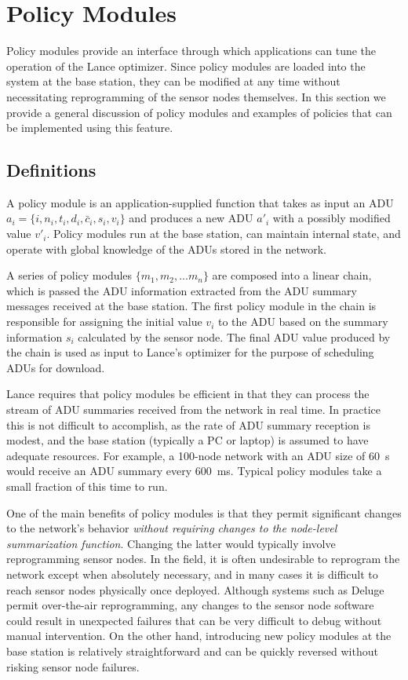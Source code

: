 \section{Policy Modules}
\label{lance-sec-policies}

Policy modules provide an interface through which applications can tune the
operation of the Lance optimizer. Since policy modules are loaded into the
system at the base station, they can be modified at any time without
necessitating reprogramming of the sensor nodes themselves. In this section
we provide a general discussion of policy modules and examples of policies
that can be implemented using this feature.

\subsection{Definitions}

A policy module is an application-supplied function that takes as input an
ADU $a_i = \{ i, n_i, t_i, d_i, \bar{c}_i, s_i, v_i \}$ and produces a new
ADU $a'_i$ with a possibly modified value $v'_i$. Policy modules run at the
base station, can maintain internal state, and operate with global knowledge
of the ADUs stored in the network.

\vfill\eject

A series of policy modules $\{m_1, m_2, ... m_n\}$ are composed into a linear
chain, which is passed the ADU information extracted from the ADU summary
messages received at the base station. The first policy module in the chain
is responsible for assigning the initial value $v_i$ to the ADU based on the
summary information $s_i$ calculated by the sensor node. The final ADU value
produced by the chain is used as input to Lance's optimizer for the purpose
of scheduling ADUs for download.

Lance requires that policy modules be efficient in that they can process the
stream of ADU summaries received from the network in real time. In practice
this is not difficult to accomplish, as the rate of ADU summary reception is
modest, and the base station (typically a PC or laptop) is assumed to have
adequate resources. For example, a 100-node network with an ADU size of
60~s would receive an ADU summary every 600~ms. Typical policy modules
take a small fraction of this time to run.

One of the main benefits of policy modules is that they permit significant
changes to the network's behavior \textit{without requiring changes to the
node-level summarization function}. Changing the latter would typically
involve reprogramming sensor nodes. In the field, it is often undesirable to
reprogram the network except when absolutely necessary, and in many cases it
is difficult to reach sensor nodes physically once deployed. Although systems
such as Deluge~\cite{deluge} permit over-the-air reprogramming, any changes
to the sensor node software could result in unexpected failures that can be
very difficult to debug without manual intervention. On the other hand,
introducing new policy modules at the base station is relatively
straightforward and can be quickly reversed without risking sensor node
failures.

